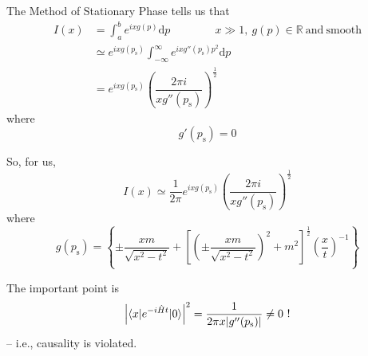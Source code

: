 \documentclass{article}
\begin{document}

\noindent The Method of Stationary Phase tells us that
\begin{align*}
I(x) &= \int_a^b e^{ i x g(p) } \mathrm{d}p \qquad \qquad x \gg 1, ~ g(p) \in \mathbb{R} ~ \mathrm{and} ~ \mathrm{smooth} \\
&\simeq e^{ i x g(p_\mathrm{s}) } \int_{-\infty}^{\infty} e^{ i x g'' (p_\mathrm{s}) p^2 } \mathrm{d}p \\
&= e^{ i x g(p_\mathrm{s}) } {\left( \dfrac{ 2 \pi i }{ x g'' (p_\mathrm{s}) } \right)}^\frac{1}{2}
\end{align*}
where
\begin{equation*}
    g' (p_\mathrm{s}) = 0
\end{equation*}

\noindent So, for us,
\begin{equation*}
    I (x) \simeq \frac{1}{2 \pi} e^{ i x g (p_\mathrm{s}) } {\left( \dfrac{ 2 \pi i }{ x g'' (p_\mathrm{s}) } \right)}^\frac{1}{2}
\end{equation*}
where
\begin{equation*}
    g (p_\mathrm{s}) = \left\lbrace \pm \dfrac{x m}{\sqrt{ x^2 - t^2 }} + {\left[ {\left( \pm \dfrac{x m}{\sqrt{ x^2 - t^2 }} \right)}^2 + m^2 \right]}^\frac{1}{2} {\left( \dfrac{x}{t} \right)}^{-1} \right\rbrace
\end{equation*}


\noindent The important point is
\begin{equation*}
    {\left| \braket{ x | e^{ -i \hat{H} t } | 0 } \right|}^2 = \dfrac{1}{ 2 \pi x | g'' (p_\mathrm{s}) | } \neq 0 ~ !
\end{equation*}
-- i.e., causality is violated.
\end{document}
